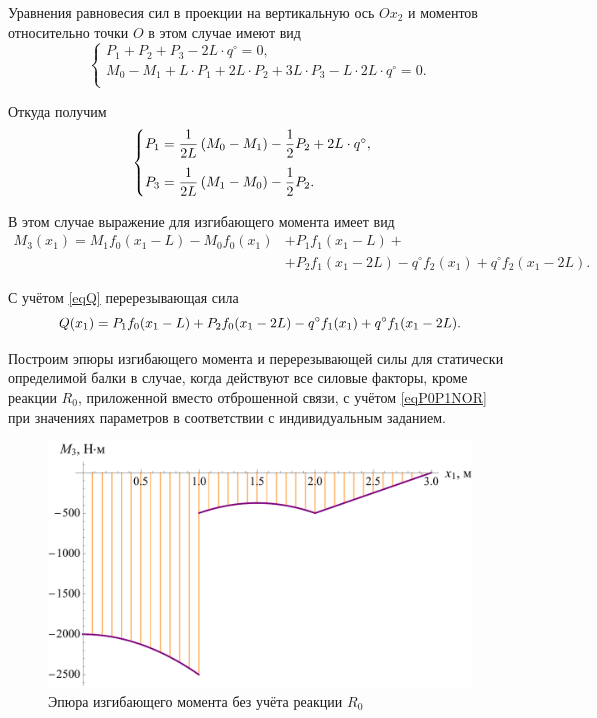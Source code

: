 \documentclass[12pt, a4paper]{article}
\begin{document}
Уравнения равновесия сил в проекции на вертикальную ось $Ox_2$ и моментов относительно точки $O$ в этом случае имеют вид
\vspace{-0.5em}
\begin{equation*}
	\begin{cases}
		P_1 + P_2 + P_3 - 2L \cdot q^{\circ} = 0, \\
		M_0 - M_1 + L \cdot P_1 + 2L \cdot P_2 + 3L \cdot P_3 - L \cdot 2L \cdot q^{\circ} = 0. \\
	\end{cases}
\end{equation*}

Откуда получим
\begin{equation}
	\begin{cases} \vspace{0.75em}
		P_1 = \dfrac{1}{2L} \left( M_0 - M_1 \right) - \dfrac{1}{2} P_2 + 2L \cdot q^{\circ}, \\ 
		P_3 = \dfrac{1}{2L} \left( M_1 - M_0 \right) - \dfrac{1}{2} P_2. \\
	\end{cases}
	\label{eqP0P1NOR}
\end{equation}

В этом случае выражение для изгибающего момента имеет вид
\begin{equation}
	\begin{split}
		M_3(x_1) = M_1 f_0(x_1 - L) - M_0 f_0(x_1) & + P_1 f_1(x_1 - L) + \\ & + P_2 f_1(x_1 - 2L) - q^{\circ} f_2(x_1) + q^{\circ} f_2(x_1 - 2L).
	\end{split}
	\label{eqM3NOR}
\end{equation}

С учётом \eqref{eqQ} перерезывающая сила
\begin{equation}
	Q(x_1) = P_1 f_0(x_1 - L) + P_2 f_0(x_1 - 2L) - q^{\circ} f_1(x_1) + q^{\circ} f_1(x_1 - 2L).\\
	\label{eqQNOR}
\end{equation}

Построим эпюры изгибающего момента и перерезывающей силы для статически определимой балки в случае, когда действуют все силовые факторы, кроме реакции $R_0$, приложенной вместо отброшенной связи, с учётом \eqref{eqP0P1NOR} при  значениях параметров в соответствии с индивидуальным заданием.

\newpage

\begin{figure}[!h]
	\centering
	\includegraphics[width=0.7\linewidth]{plot-8}
	\caption{Эпюра изгибающего момента без учёта реакции $R_0$}
\end{figure} 
\end{document}
